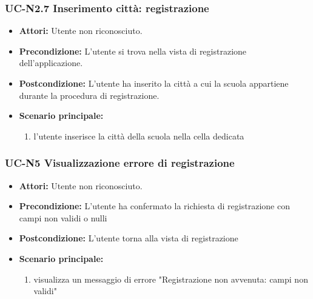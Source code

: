 \subsubsection{UC-N2.7 Inserimento città: registrazione}
\begin{itemize}
	\item \textbf{Attori: }Utente non riconosciuto.
	\item \textbf{Precondizione: }L'utente si trova nella vista 		di registrazione dell'applicazione.
	\item \textbf{Postcondizione: }L'utente ha inserito la città a cui la scuola appartiene durante la procedura di registrazione.
	\item \textbf{Scenario principale: }
	\begin{enumerate}
		\item l'utente inserisce la città della scuola nella cella dedicata
	\end{enumerate}
\end{itemize}

\subsubsection{UC-N5 Visualizzazione errore di registrazione}
\begin{itemize}
	\item \textbf{Attori:} Utente non riconosciuto.
	\item \textbf{Precondizione:} L'utente ha confermato la richiesta di registrazione con campi non validi o nulli
	\item \textbf{Postcondizione:} L'utente torna alla vista di registrazione
	\item  \textbf{Scenario principale: }
	\begin{enumerate}
		\item visualizza un messaggio di errore "Registrazione non avvenuta: campi non validi"
	\end{enumerate}
\end{itemize}

